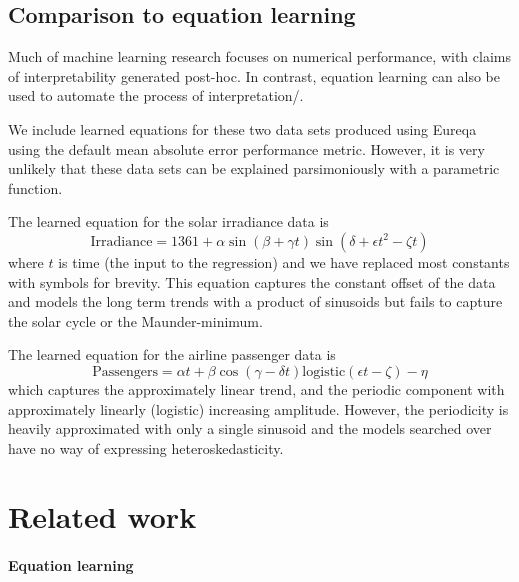 \documentclass{article}
\begin{document}
\subsection{Comparison to equation learning}

Much of machine learning research focuses on numerical performance, with claims of interpretability generated post-hoc.
In contrast, equation learning \citep{Schmidt2009b} can also be used to automate the process of interpretation/.

We include learned equations for these two data sets produced using Eureqa \citep{Eureqa} using the default mean absolute error performance metric\footnotemark.
However, it is very unlikely that these data sets can be explained parsimoniously with a parametric function.

The learned equation for the solar irradiance data is
\begin{equation}
\textrm{Irradiance} = 1361 + \alpha\sin(\beta + \gamma t)\sin(\delta + \epsilon t^2 - \zeta t)
\end{equation}
where $t$ is time (the input to the regression) and we have replaced most constants with symbols for brevity.
This equation captures the constant offset of the data and models the long term trends with a product of sinusoids but fails to capture the solar cycle or the Maunder-minimum.

The learned equation for the airline passenger data is
\begin{equation}
\textrm{Passengers} = \alpha t + \beta\cos(\gamma - \delta t)\textrm{logistic}(\epsilon t - \zeta) - \eta
\end{equation}
which captures the approximately linear trend, and the periodic component with approximately linearly (logistic) increasing amplitude.
However, the periodicity is heavily approximated with only a single sinusoid and the models searched over have no way of expressing heteroskedasticity.






\section{Related work}

\paragraph{Equation learning}
\end{document}
